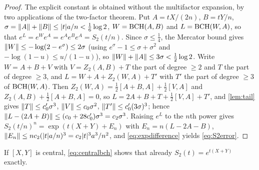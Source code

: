 \begin{proof}
The explicit constant is obtained without the multifactor expansion, by two
applications of the two-factor theorem. Put $A=tX/(2n)$, $B=tY/n$,
$\sigma=\left\lVert A\right\rVert+\left\lVert B\right\rVert\leq|t|a/n<\tfrac16\log2$, $W=\operatorname{BCH}(A,B)$ and
$L=\operatorname{BCH}(W,A)$, so that $e^L=e^We^A=e^Ae^Be^A=S_2(t/n)$. Since
$\sigma\leq\tfrac14$, the Mercator bound gives
$\left\lVert W\right\rVert\leq-\log(2-e^{\sigma})\leq2\sigma$ (using $e^\sigma-1\leq\sigma+\sigma^2$
and $-\log(1-u)\leq u/(1-u)$), so $\left\lVert W\right\rVert+\left\lVert A\right\rVert\leq3\sigma<\tfrac12\log2$.
Write $W=A+B+V$ with $V=Z_2(A,B)+T$ the part of degree $\geq2$ and $T$ the
part of degree $\geq3$, and $L=W+A+Z_2(W,A)+T'$ with $T'$ the part of degree
$\geq3$ of $\operatorname{BCH}(W,A)$. Then $Z_2(W,A)=\tfrac12[A+B,A]+\tfrac12[V,A]$ and
$Z_2(A,B)+\tfrac12[A+B,A]=0$, so $L=2A+B+T+\tfrac12[V,A]+T'$, and
\cref{lem:tail} gives $\left\lVert T\right\rVert\leq c_0'\sigma^3$, $\left\lVert V\right\rVert\leq c_0\sigma^2$,
$\left\lVert T'\right\rVert\leq c_0'(3\sigma)^3$; hence
$\left\lVert L-(2A+B)\right\rVert\leq(c_0+28c_0')\sigma^3=c_2\sigma^3$. Raising $e^L$ to the
$n$th power gives $S_2(t/n)^n=\exp(t(X+Y)+E_n)$ with $E_n=n(L-2A-B)$,
$\left\lVert E_n\right\rVert\leq nc_2(|t|a/n)^3=c_2|t|^3a^3/n^2$, and \eqref{eq:expdifference}
yields \eqref{eq:S2error}.
\end{proof}
If $[X,Y]$ is central, \eqref{eq:centralbch} shows that already
$S_2(t)=e^{t(X+Y)}$ exactly.

